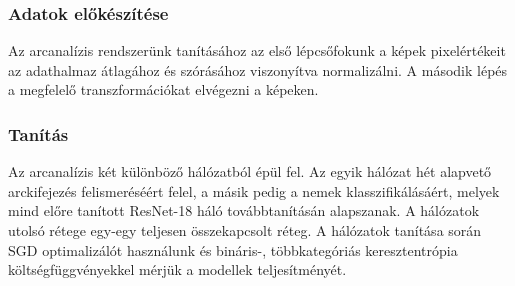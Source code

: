 \documentclass[12pt,a4]{article}
\begin{document}
            \subsubsection{Adatok előkészítése}

                Az arcanalízis rendszerünk tanításához az első lépcsőfokunk a képek pixelértékeit az adathalmaz átlagához és szórásához viszonyítva normalizálni. A második lépés a megfelelő transzformációkat elvégezni a képeken.

            \subsubsection{Tanítás}
                
                    Az arcanalízis két különböző hálózatból épül fel. Az egyik hálózat hét alapvető arckifejezés felismeréséért felel, a másik pedig a nemek klasszifikálásáért,
                    melyek mind előre tanított ResNet-18 háló továbbtanításán alapszanak.
                    A hálózatok utolsó rétege egy-egy teljesen összekapcsolt réteg.
                    A hálózatok tanítása során SGD optimalizálót használunk és bináris-, többkategóriás keresztentrópia költségfüggvényekkel mérjük a modellek teljesítményét.
\end{document}
